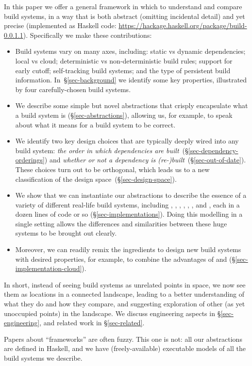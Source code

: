 In this paper we offer a general framework in which to understand and compare
build systems, in a way that is both abstract (omitting incidental detail)
and yet precise (implemented as Haskell code:
\url{https://hackage.haskell.org/package/build-0.0.1.1}). Specifically we make
these contributions:
\begin{itemize}
\item Build systems vary on many axes, including: static vs dynamic
  dependencies; local vs cloud; deterministic vs non-deterministic build rules;
  support for early cutoff; self-tracking build systems; and the type of
  persistent build information. In~\S\ref{sec-background} we identify some key
  properties, illustrated by four carefully-chosen build systems.

\item We describe some simple but novel abstractions that
  crisply encapsulate what a build system is (\S\ref{sec-abstractions}),
  allowing us, for example, to speak about what it means for a build system to be correct.

\item We identify two key design choices that are typically deeply wired into
  any build system: \emph{the order in which dependencies are
  built}~(\S\ref{sec-dependency-orderings}) and \emph{whether or not a
  dependency is (re-)built}~(\S\ref{sec-out-of-date}). These choices turn out to
  be orthogonal, which leads us to a new classification of the design
  space~(\S\ref{sec-design-space}).

\item We show that we can instantiate our abstractions to describe the essence
of a variety of different real-life build systems, including \Make, \Shake,
\Bazel, \CloudBuild, \Buck, \Nix, and \Excel, each in a dozen lines of code
or so (\S\ref{sec-implementations}). Doing this modelling in a single setting
allows the differences and similarities between these huge systems to be
brought out clearly.

\item Moreover, we can readily remix the ingredients to design new build systems
with desired properties, for example, to combine the advantages of \Shake and
\Bazel (\S\ref{sec-implementation-cloud}).

\end{itemize}
In short, instead of seeing build systems as unrelated
points in space, we now see them as locations in a connected landscape,
leading to a better understanding of what they do and how they compare,
and suggesting exploration of other (as yet unoccupied points) in the
landscape.
We discuss engineering aspects in \S\ref{sec-engineering}, and related
work in \S\ref{sec-related}.

Papers about ``frameworks'' are often fuzzy.  This one is not: all our
abstractions are defined in Haskell, and we have (freely-available)
executable models of all the build systems we describe.
